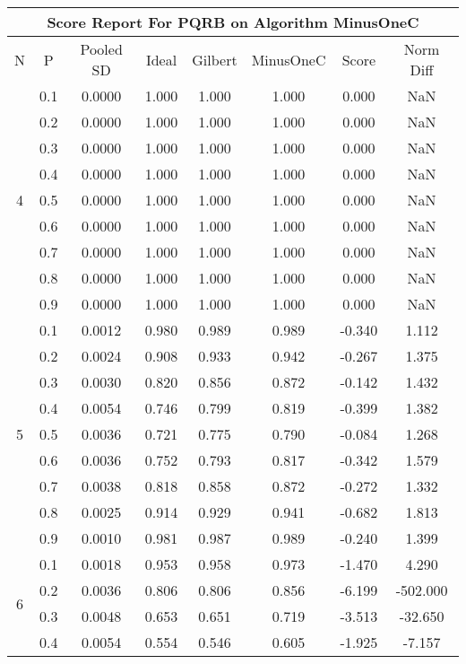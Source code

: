 \documentclass[11pt,a4paper]{report}
\begin{document}
\begin{longtable}{ | c | c || c | c | c | c | c | c | }
\hline
\multicolumn{8}{|c|}{ Score Report For PQRB on Algorithm MinusOneC} \\
\hline
N & P & Pooled SD &  Ideal &  Gilbert & MinusOneC  & Score & Norm Diff \\
 \hline
 \hline
 \endhead
\multirow{9}{*}{4} & 0.1 & 0.0000 & 1.000 & 1.000 & 1.000 & 0.000 & NaN \\
 & 0.2 & 0.0000 & 1.000 & 1.000 & 1.000 & 0.000 & NaN \\
 & 0.3 & 0.0000 & 1.000 & 1.000 & 1.000 & 0.000 & NaN \\
 & 0.4 & 0.0000 & 1.000 & 1.000 & 1.000 & 0.000 & NaN \\
 & 0.5 & 0.0000 & 1.000 & 1.000 & 1.000 & 0.000 & NaN \\
 & 0.6 & 0.0000 & 1.000 & 1.000 & 1.000 & 0.000 & NaN \\
 & 0.7 & 0.0000 & 1.000 & 1.000 & 1.000 & 0.000 & NaN \\
 & 0.8 & 0.0000 & 1.000 & 1.000 & 1.000 & 0.000 & NaN \\
 & 0.9 & 0.0000 & 1.000 & 1.000 & 1.000 & 0.000 & NaN \\
 \hline
\multirow{9}{*}{5} & 0.1 & 0.0012 & 0.980 & 0.989 & 0.989 & -0.340 & 1.112 \\
 & 0.2 & 0.0024 & 0.908 & 0.933 & 0.942 & -0.267 & 1.375 \\
 & 0.3 & 0.0030 & 0.820 & 0.856 & 0.872 & -0.142 & 1.432 \\
 & 0.4 & 0.0054 & 0.746 & 0.799 & 0.819 & -0.399 & 1.382 \\
 & 0.5 & 0.0036 & 0.721 & 0.775 & 0.790 & -0.084 & 1.268 \\
 & 0.6 & 0.0036 & 0.752 & 0.793 & 0.817 & -0.342 & 1.579 \\
 & 0.7 & 0.0038 & 0.818 & 0.858 & 0.872 & -0.272 & 1.332 \\
 & 0.8 & 0.0025 & 0.914 & 0.929 & 0.941 & -0.682 & 1.813 \\
 & 0.9 & 0.0010 & 0.981 & 0.987 & 0.989 & -0.240 & 1.399 \\
 \hline
\multirow{9}{*}{6} & 0.1 & 0.0018 & 0.953 & 0.958 & 0.973 & -1.470 & 4.290 \\
 & 0.2 & 0.0036 & 0.806 & 0.806 & 0.856 & -6.199 & -502.000 \\
 & 0.3 & 0.0048 & 0.653 & 0.651 & 0.719 & -3.513 & -32.650 \\
 & 0.4 & 0.0054 & 0.554 & 0.546 & 0.605 & -1.925 & -7.157 \\

\end{longtable}
\end{document}
